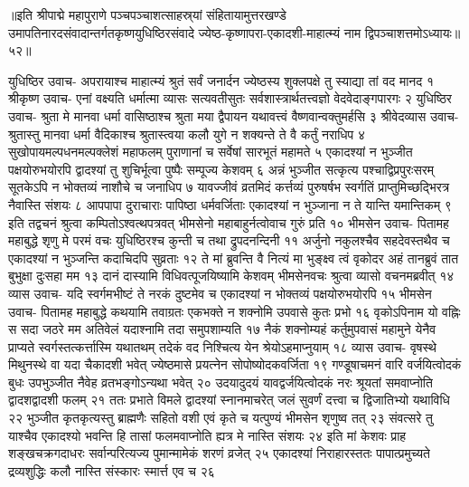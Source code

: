 ॥इति श्रीपाद्मे महापुराणे पञ्चपञ्चाशत्साहस्र्यां संहितायामुत्तरखण्डे उमापतिनारदसंवादान्तर्गतकृष्णयुधिष्ठिरसंवादे ज्येष्ठ-कृष्णापरा-एकादशी-माहात्म्यं नाम द्विपञ्चाशत्तमोऽध्यायः॥५२॥



युधिष्ठिर उवाच-
अपरायाश्च माहात्म्यं श्रुतं सर्वं जनार्दन 
ज्येष्ठस्य शुक्लपक्षे तु स्याद्या तां वद मानद १
श्रीकृष्ण उवाच-
एनां वक्ष्यति धर्मात्मा व्यासः सत्यवतीसुतः 
सर्वशास्त्रार्थतत्त्वज्ञो वेदवेदाङ्गपारगः २
युधिष्ठिर उवाच-
श्रुता मे मानवा धर्मा वासिष्ठाश्च श्रुता मया 
द्वैपायन यथावत्त्वं वैष्णवान्वक्तुमर्हसि ३
श्रीवेदव्यास उवाच-
श्रुतास्तु मानवा धर्मा वैदिकाश्च श्रुतास्त्वया 
कलौ युगे न शक्यन्ते ते वै कर्तुं नराधिप ४
सुखोपायमल्पधनमल्पक्लेशं महाफलम् 
पुराणानां च सर्वेषां सारभूतं महामते ५
एकादश्यां न भुञ्जीत पक्षयोरुभयोरपि 
द्वादश्यां तु शुचिर्भूत्वा पुष्पैः सम्पूज्य केशवम् ६
अन्नं भुञ्जीत सत्कृत्य पश्चाद्विप्रपुरःसरम् 
सूतकेऽपि न भोक्तव्यं नाशौचे च जनाधिप ७
यावज्जीवं व्रतमिदं कर्त्तव्यं पुरुषर्षभ 
स्वर्गतिं प्राप्तुमिच्छद्भिरत्र नैवास्ति संशयः ८
आपपापा दुराचाराः पापिष्ठा धर्मवर्जिताः 
एकादश्यां न भुञ्जाना न ते यान्ति यमान्तिकम् ९
इति तद्वचनं श्रुत्वा कम्पितोऽश्वत्थपत्रवत् 
भीमसेनो महाबाहुर्नत्वोवाच गुरुं प्रति १०
भीमसेन उवाच-
पितामह महाबुद्धे शृणु मे परमं वचः 
युधिष्ठिरश्च कुन्ती च तथा द्रुपदनन्दिनी ११
अर्जुनो नकुलश्चैव सहदेवस्तथैव च 
एकादश्यां न भुञ्जन्ति कदाचिदपि सुव्रताः १२
ते मां ब्रुवन्ति वै नित्यं मा भुङ्क्ष्व त्वं वृकोदर 
अहं तानब्रुवं तात बुभुक्षा दुःसहा मम १३
दानं दास्यामि विधिवत्पूजयिष्यामि केशवम् 
भीमसेनवचः श्रुत्वा व्यासो वचनमब्रवीत् १४
व्यास उवाच-
यदि स्वर्गमभीष्टं ते नरकं दुष्टमेव च 
एकादश्यां न भोक्तव्यं पक्षयोरुभयोरपि १५
भीमसेन उवाच-
पितामह महाबुद्धे कथयामि तवाग्रतः 
एकभक्ते न शक्नोमि उपवासे कुतः प्रभो १६
वृकोऽपिनाम यो वह्निः स सदा जठरे मम 
अतिवेलं यदाश्नामि तदा समुपशाम्यति १७
नैकं शक्नोम्यहं कर्तुमुपवासं महामुने 
येनैव प्राप्यते स्वर्गस्तत्कर्त्तास्मि यथातथम् 
तदेकं वद निश्चित्य येन श्रेयोऽहमाप्नुयाम् १८
व्यास उवाच-
वृषस्थे मिथुनस्थे वा यदा चैकादशी भवेत् 
ज्येष्ठमासे प्रयत्नेन सोपोष्योदकवर्जिता १९
गण्डूषाचमनं वारि वर्जयित्वोदकं बुधः 
उपभुञ्जीत नैवेह व्रतभङ्गोऽन्यथा भवेत् २०
उदयादुदयं यावद्वर्जयित्वोदकं नरः 
श्रूयतां समवाप्नोति द्वादशद्वादशी फलम् २१
ततः प्रभाते विमले द्वादश्यां स्नानमाचरेत् 
जलं सुवर्णं दत्त्वा च द्विजातिभ्यो यथाविधि २२
भुञ्जीत कृतकृत्यस्तु ब्राह्मणैः सहितो वशी 
एवं कृते च यत्पुण्यं भीमसेन शृणुष्व तत् २३
संवत्सरे तु याश्चैव एकादश्यो भवन्ति हि 
तासां फलमवाप्नोति ह्यत्र मे नास्ति संशयः २४
इति मां केशवः प्राह शङ्खचक्रगदाधरः 
सर्वान्परित्यज्य पुमान्मामेकं शरणं व्रजेत् २५
एकादश्यां निराहारस्ततः पापात्प्रमुच्यते 
द्रव्यशुद्धिः कलौ नास्ति संस्कारः स्मार्त्त एव च २६
